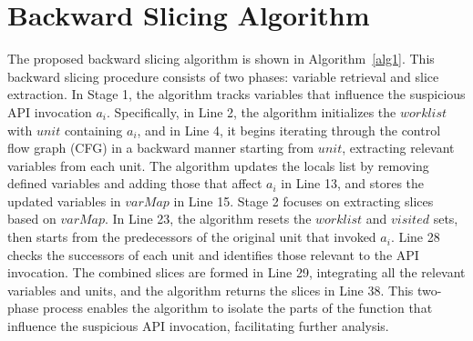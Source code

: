 \section{Backward Slicing Algorithm}
\label{slicing}

\noindent The proposed backward slicing algorithm is shown in Algorithm~\ref{alg1}. This backward slicing procedure consists of two phases: variable retrieval and slice extraction. In Stage 1, the algorithm tracks variables that influence the suspicious API invocation $a_i$. Specifically, in Line 2, the algorithm initializes the $worklist$ with $unit$ containing $a_i$, and in Line 4, it begins iterating through the control flow graph (CFG) in a backward manner starting from $unit$, extracting relevant variables from each unit. The algorithm updates the locals list by removing defined variables and adding those that affect $a_i$ in Line 13, and stores the updated variables in $varMap$ in Line 15. Stage 2 focuses on extracting slices based on $varMap$. In Line 23, the algorithm resets the $worklist$ and $visited$ sets, then starts from the predecessors of the original unit that invoked $a_i$. Line 28 checks the successors of each unit and identifies those relevant to the API invocation. The combined slices are formed in Line 29, integrating all the relevant variables and units, and the algorithm returns the slices in Line 38. This two-phase process enables the algorithm to isolate the parts of the function that influence the suspicious API invocation, facilitating further analysis.

